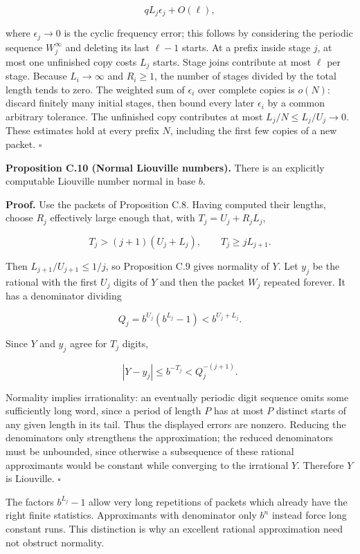 \documentclass[11pt,a4paper]{article}
\begin{document}
\[
qL_j\epsilon_j+O(\ell),
\]

where \(\epsilon_j\to0\) is the cyclic frequency error; this follows by
considering the periodic sequence \(W_j^\infty\) and deleting its last
\(\ell-1\) starts. At a prefix inside stage \(j\), at most one
unfinished copy costs \(L_j\) starts. Stage joins contribute at most
\(\ell\) per stage. Because \(L_i\to\infty\) and \(R_i\ge1\), the number
of stages divided by the total length tends to zero. The weighted sum of
\(\epsilon_i\) over complete copies is \(o(N)\): discard finitely many
initial stages, then bound every later \(\epsilon_i\) by a common
arbitrary tolerance. The unfinished copy contributes at most
\(L_j/N\le L_j/U_j\to0\). These estimates hold at every prefix \(N\),
including the first few copies of a new packet. \(\square\)

\textbf{Proposition C.10 (Normal Liouville numbers).} There is an
explicitly computable Liouville number normal in base \(b\).

\textbf{Proof.} Use the packets of Proposition C.8. Having computed
their lengths, choose \(R_j\) effectively large enough that, with
\(T_j=U_j+R_jL_j\),

\[
T_j>(j+1)(U_j+L_j),\qquad T_j\ge j L_{j+1}.
\]

Then \(L_{j+1}/U_{j+1}\le1/j\), so Proposition C.9 gives normality of
\(Y\). Let \(y_j\) be the rational with the first \(U_j\) digits of
\(Y\) and then the packet \(W_j\) repeated forever. It has a denominator
dividing

\[
Q_j=b^{U_j}(b^{L_j}-1)< b^{U_j+L_j}.
\]

Since \(Y\) and \(y_j\) agree for \(T_j\) digits,

\[
|Y-y_j|\le b^{-T_j}< Q_j^{-(j+1)}.
\]

Normality implies irrationality: an eventually periodic digit sequence
omits some sufficiently long word, since a period of length \(P\) has at
most \(P\) distinct starts of any given length in its tail. Thus the
displayed errors are nonzero. Reducing the denominators only strengthens
the approximation; the reduced denominators must be unbounded, since
otherwise a subsequence of these rational approximants would be constant
while converging to the irrational \(Y\). Therefore \(Y\) is Liouville.
\(\square\)

The factors \(b^{L_j}-1\) allow very long repetitions of packets which
already have the right finite statistics. Approximants with denominator
only \(b^n\) instead force long constant runs. This distinction is why
an excellent rational approximation need not obstruct normality.
\end{document}
